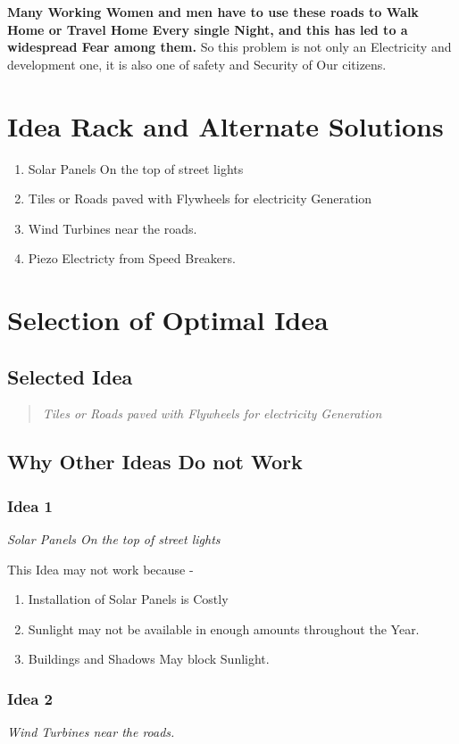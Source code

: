 \documentclass[11pt]{article}
\begin{document}
\textbf{Many Working Women and men have to use these roads to Walk Home or Travel Home Every single Night, and this has led to a widespread Fear among them.} So this problem is not only an Electricity and development one, it is also one of safety and Security of Our citizens.

\section{Idea Rack and Alternate Solutions}
\begin{enumerate}
	\item Solar Panels On the top of street lights
	\item Tiles or Roads paved with Flywheels for electricity Generation
	\item Wind Turbines near the roads.
	\item Piezo Electricty from Speed Breakers.
\end{enumerate}
\section{Selection of Optimal Idea}

\subsection{Selected Idea}
\begin{quotation}
	\textit{{\Large Tiles or Roads paved with Flywheels for electricity Generation}}
\end{quotation}
\subsection{Why Other Ideas Do not Work}
\subsubsection{Idea 1}
\textit{Solar Panels On the top of street lights}

This Idea may not work because - 
\begin{enumerate}
	\item Installation of Solar Panels is Costly
	\item Sunlight may not be available in enough amounts throughout the Year.
	\item Buildings and Shadows May block Sunlight.
\end{enumerate}

\subsubsection{Idea 2}
\textit{Wind Turbines near the roads.}
\end{document}
